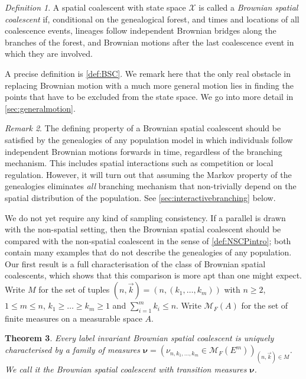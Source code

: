 \documentclass[reqno,draft]{amsart}
\numberwithin{equation}{section}
\theoremstyle{plain}
\newtheorem{theorem}{Theorem}[section]
\theoremstyle{remark}
\newtheorem{remark}[theorem]{Remark}
\newtheorem{definition}[theorem]{Definition}
\newcommand{\mergers}{M}
\begin{document}
\begin{definition}\label{def:BSCintro}
    A spatial coalescent with state space $\mathcal{X}$ is called a \emph{Brownian spatial coalescent} if, conditional on the genealogical forest, and times and locations of all coalescence events, lineages follow independent Brownian bridges along the branches of the forest, and Brownian motions after the last coalescence event in which they are involved.
\end{definition}
A precise definition is \cref{def:BSC}. We remark here that the only real obstacle in replacing Brownian motion with a much more general motion lies in finding the points that have to be excluded from the state space. We go into more detail in \cref{sec:generalmotion}.

\begin{remark}
    The defining property of a Brownian spatial coalescent should be satisfied by the genealogies of any population model in which individuals follow independent Brownian motions forwards in time, regardless of the branching mechanism. This includes spatial interactions such as competition or local regulation. However, it will turn out that assuming the Markov property of the genealogies eliminates \emph{all} branching mechanism that non-trivially depend on the spatial distribution of the population. See \cref{sec:interactivebranching} below.
\end{remark}

We do not yet require any kind of sampling consistency. If a parallel is drawn with the non-spatial setting, then the Brownian spatial coalescent should be compared with the non-spatial coalescent in the sense of \cref{def:NSCPintro}; both contain many examples that do not describe the genealogies of any population. Our first result is a full characterisation of the class of Brownian spatial coalescents, which shows that this comparison is more apt than one might expect. Write $\mergers$ for the set of tuples $(n,\vec{k}) = (n,(k_1, \ldots ,k_m))$ with $n \ge 2$, $1 \le m \le n$, $k_1 \ge \ldots \ge k_m \ge 1$ and $\sum_{i=1}^m k_i \le n$. Write $\mathcal{M}_F(A)$ for the set of finite measures on a measurable space $A$.
\begin{theorem}\label{thm:BSCintro}
    Every label invariant Brownian spatial coalescent is uniquely characterised by a family of measures $\boldsymbol \nu = (\nu_{n,k_1, \ldots ,k_m} \in \mathcal{M}_F(E^m))_{(n,\vec{k}) \in \mergers}$. We call it the \emph{Brownian spatial coalescent with transition measures $\boldsymbol \nu$}.
\end{theorem}
\end{document}
